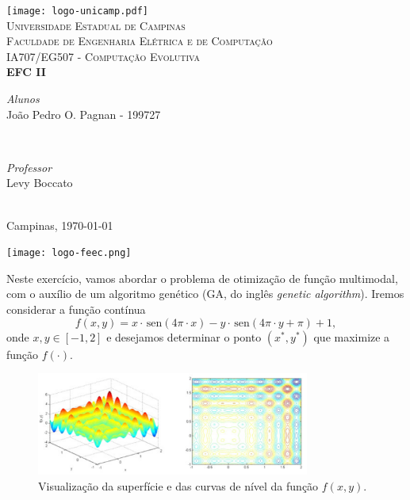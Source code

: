 \documentclass[a4paper, 12pt]{article}
\newcommand{\sen}{\hspace{2pt}\mathrm{sen}}
\begin{document}
\begin{titlepage}
\newcommand{\HRule}{\rule{\linewidth}{0.5mm}}
	
\centering

\texttt{[image: logo-unicamp.pdf]}\\[0.5cm]	
\textsc{\Large Universidade Estadual de Campinas}\\[2.0cm]
\textsc{\large Faculdade de Engenharia Elétrica e de Computação}\\[0.5cm]
	
\textsc{IA707/EG507 - Computação Evolutiva}\\[2.5cm]
	
{\LARGE \bfseries EFC II}\\[3.5cm]

\begin{minipage}[t]{0.4\textwidth}
	\begin{flushleft}
    \textit{Alunos}\\
    João Pedro O. Pagnan - 199727
	\end{flushleft}
\end{minipage}
~
\begin{minipage}[t]{0.4\textwidth}
	\begin{flushright}
		\textit{Professor}\\
		Levy Boccato
	\end{flushright}
\end{minipage}\\[4.5cm]

{Campinas, \today}

\vfill\vfill\vfill\vfill\vfill

\texttt{[image: logo-feec.png]}\\[0.5cm]
\vfill

\end{titlepage}

\justify

Neste exercício, vamos abordar o problema de otimização de função multimodal, com o auxílio de um algoritmo genético (GA, do inglês \textit{genetic algorithm}). Iremos considerar a função contínua
$$f (x, y) = x \cdot \sen(4\pi \cdot x) - y \cdot \sen(4\pi \cdot y + \pi) + 1,$$
onde $x, y \in [-1, 2]$ e desejamos determinar o ponto $(x^{*} , y^{*})$ que maximize a função $f(\cdot )$.
\begin{figure}[H]
    \centering
    \includegraphics[width=0.8\textwidth]{figuras/grafico-funcao.png}
    \caption{Visualização da superfície e das curvas de nível da função $f (x, y)$.}
    \label{fig:grafico-funcao}
\end{figure}
\end{document}
